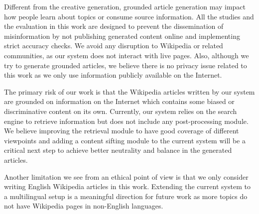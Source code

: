 Different from the creative generation, grounded article generation may impact how people learn about topics or consume source information. All the studies and the evaluation in this work are designed to prevent the dissemination of misinformation by not publishing generated content online and implementing strict accuracy checks. We avoid any disruption to Wikipedia or related communities, as our system does not interact with live pages. Also, although we try to generate grounded articles, we believe there is no privacy issue related to this work as we only use information publicly available on the Internet.

The primary risk of our work is that the Wikipedia articles written by our system are grounded on information on the Internet which contains some biased or discriminative content on its own. Currently, our system relies on the search engine to retrieve information but does not include any post-processing module. We believe improving the retrieval module to have good coverage of different viewpoints and adding a content sifting module to the current system will be a critical next step to achieve better neutrality and balance in the generated articles. %

Another limitation we see from an ethical point of view is that we only consider writing English Wikipedia articles in this work. Extending the current system to a multilingual setup is a meaningful direction for future work as more topics do not have Wikipedia pages in non-English languages.
